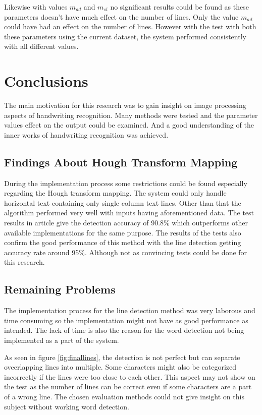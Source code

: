 \documentclass{article}
\begin{document}
    Likewise with values $m_{ad}$ and $m_{sl}$ no significant results could be found as these parameters doesn't have much effect on the number of lines. Only the value $m_{ad}$ could have had an effect on the number of lines. However with the test with both these parameters using the current dataset, the system performed consistently with all different values.

  \newpage
  \section{Conclusions}
    The main motivation for this research was to gain insight on image processing aspects of handwriting recognition. Many methods were tested and the parameter values effect on the output could be examined. And a good understanding of the inner works of handwriting recognition was achieved.

    \subsection{Findings About Hough Transform Mapping}
      During the implementation process some restrictions could be found especially regarding the Hough transform mapping. The system could only handle horizontal text containing only single column text lines. Other than that the algorithm performed very well with inputs having aforementioned data. The test results in article \cite{Louloudis2} give the detection accuracy of 90.8\% which outperforms other available implementations for the same purpose. The results of the tests also confirm the good performance of this method with the line detection getting accuracy rate around 95\%. Although not as convincing tests could be done for this research.

    \subsection{Remaining Problems}
      The implementation process for the line detection method was very laborous and time consuming so the implementation might not have as good performance as intended. The lack of time is also the reason for the word detection not being implemented as a part of the system.

      As seen in figure \ref{fig:finallines}, the detection is not perfect but can separate oveerlapping lines into multiple. Some characters might also be categorized incorrectly if the lines were too close to each other. This aspect may not show on the test as the number of lines can be correct even if some characters are a part of a wrong line. The chosen evaluation methods could not give insight on this subject without working word detection.
\end{document}
